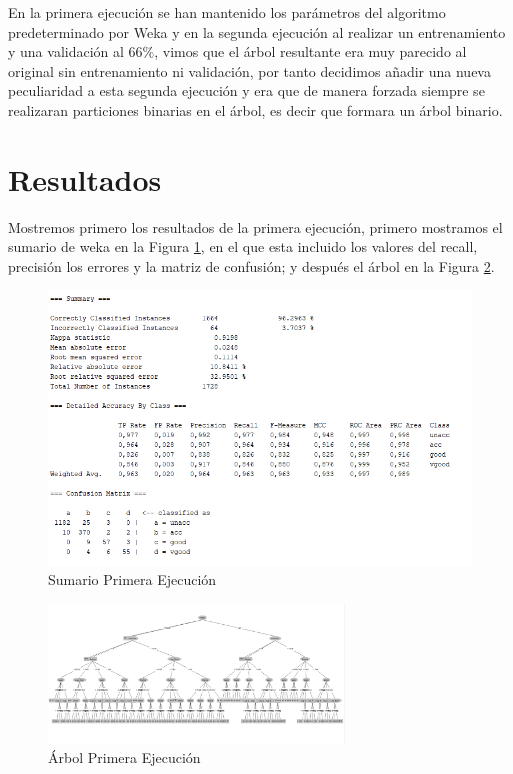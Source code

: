 \documentclass[a4paper, 11pt, twoside, openany, onecolumn, final]{memoir}
\begin{document}
		En la primera ejecución se han mantenido los parámetros del algoritmo predeterminado por Weka y en la segunda ejecución al realizar un entrenamiento y una validación al $66\%$, vimos que el árbol resultante era muy parecido al original sin entrenamiento ni validación, por tanto decidimos añadir una nueva peculiaridad a esta segunda ejecución y era que de manera forzada siempre se realizaran particiones binarias en el árbol, es decir que formara un árbol binario.
	\section{Resultados}
	Mostremos primero los resultados de la primera ejecución, primero mostramos el sumario de weka en la Figura \ref{SumarioPrimeraEjecucion}, en el que esta incluido los valores del recall, precisión los errores y la matriz de confusión; y después el árbol en la Figura \ref{ArbolPrimeraEjecucion}.
	\begin{figure}
  		\centering
   		\includegraphics{Imagenes/SummarySinEntreNiVal}
  		\caption{Sumario Primera Ejecución}
  		\label{SumarioPrimeraEjecucion}
	\end{figure}	
	
	\begin{figure}
  		\centering
   		\includegraphics[width=0.7\textwidth]{Imagenes/ArbolSinEntreNiVal}
  		\caption{Árbol Primera Ejecución}
  		\label{ArbolPrimeraEjecucion}
	\end{figure}
	
\end{document}
